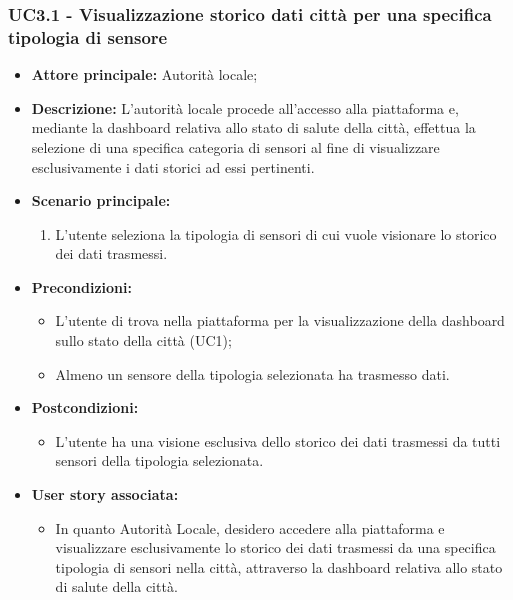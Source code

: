 \documentclass{article}
\begin{document}
\subsubsection{UC3.1 - Visualizzazione storico dati città per una specifica tipologia di sensore}
\begin{itemize}
    \item \textbf{Attore principale:} Autorità locale;
    \item \textbf{Descrizione:} L'autorità locale procede all'accesso alla piattaforma e, mediante la dashboard relativa allo stato di salute della città, effettua la selezione di una specifica categoria di sensori al fine di visualizzare esclusivamente i dati storici ad essi pertinenti.
    \item \textbf{Scenario principale:}
          \begin{enumerate}
              \item L'utente seleziona la tipologia di sensori di cui vuole visionare lo storico dei dati trasmessi.
          \end{enumerate}
    \item \textbf{Precondizioni:}
          \begin{itemize}
              \item  L'utente di trova  nella piattaforma per la visualizzazione della dashboard sullo stato della città (UC1);
              \item  Almeno un sensore della tipologia selezionata ha trasmesso dati.
          \end{itemize}
    \item \textbf{Postcondizioni:}
          \begin{itemize}
              \item  L'utente ha una visione esclusiva dello storico dei dati trasmessi da tutti sensori della tipologia selezionata.
          \end{itemize}
    \item \textbf{User story associata:}
          \begin{itemize}
              \item In quanto Autorità Locale, desidero accedere alla piattaforma e visualizzare esclusivamente lo storico dei dati trasmessi da una specifica tipologia di sensori nella città, attraverso la dashboard relativa allo stato di salute della città.
          \end{itemize}
\end{itemize}
\end{document}
